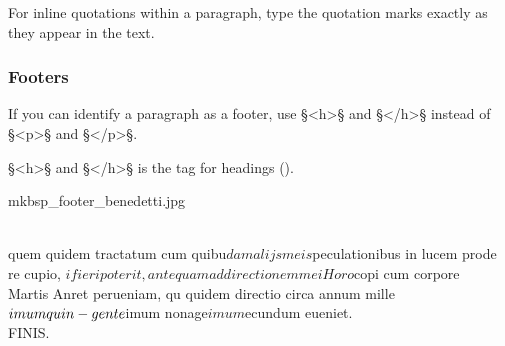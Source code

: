 
\begin{note}
For inline quotations within a paragraph, type the quotation marks exactly as they appear in the text.
\end{note}

\subsubsection{Footers}

\begin{mainruleLessImportant}
If you can identify a paragraph as a footer, use §<h>§ and §</h>§ instead of §<p>§ and §</p>§.
\end{mainruleLessImportant}

\begin{crossref}
§<h>§ and §</h>§ is the tag for headings ().
\end{crossref}

\begin{sampleImage}{mkbsp_footer_benedetti.jpg}
\begin{typeLatin}
\someText \\
quem quidem tractatum cum quibu$dam alijs meis $peculationibus in lucem prode\\
re cupio, $i fieri poterit, antequam ad directionem mei Horo$copi cum corpore\\
Martis Anret perueniam, qu quidem directio circa annum mille$imum quin-\\
gente$imum nonage$imum $ecundum eueniet.\\
FINIS.
\end{typeLatin}

\end{sampleImage}

